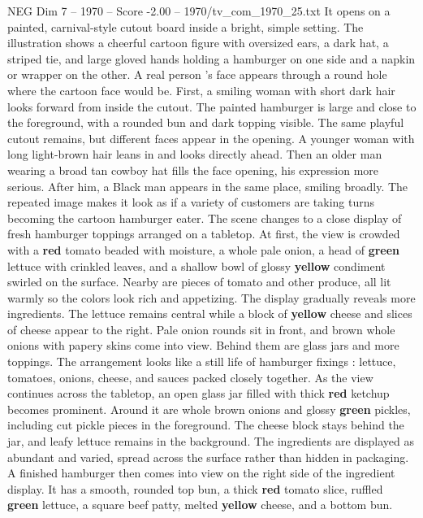 \begin{textsample}{NEG Dim 7 – 1970 – Score -2.00 – 1970/tv\_com\_1970\_25.txt}  \label{ex:f7_neg_069}
It opens on a painted, carnival-style cutout board inside a bright, simple setting.
The illustration shows a cheerful cartoon figure with oversized ears, a dark hat, a striped tie, and large gloved hands holding a hamburger on one side and a napkin or wrapper on the other.
A real person ’s face appears through a round hole where the cartoon face would be.
First, a smiling woman with short dark hair looks forward from inside the cutout.
The painted hamburger is large and close to the foreground, with a rounded bun and dark topping visible.
The same playful cutout remains, but different faces appear in the opening.
A younger woman with long light-brown hair leans in and looks directly ahead.
Then an older man wearing a broad tan cowboy hat fills the face opening, his expression more serious.
After him, a Black man appears in the same place, smiling broadly.
The repeated image makes it look as if a variety of customers are taking turns becoming the cartoon hamburger eater.
The scene changes to a close display of fresh hamburger toppings arranged on a tabletop.
At first, the view is crowded with a \textbf{red} tomato beaded with moisture, a whole pale onion, a head of \textbf{green} lettuce with crinkled leaves, and a shallow bowl of glossy \textbf{yellow} condiment swirled on the surface.
Nearby are pieces of tomato and other produce, all lit warmly so the colors look rich and appetizing.
The display gradually reveals more ingredients.
The lettuce remains central while a block of \textbf{yellow} cheese and slices of cheese appear to the right.
Pale onion rounds sit in front, and brown whole onions with papery skins come into view.
Behind them are glass jars and more toppings.
The arrangement looks like a still life of hamburger fixings : lettuce, tomatoes, onions, cheese, and sauces packed closely together.
As the view continues across the tabletop, an open glass jar filled with thick \textbf{red} ketchup becomes prominent.
Around it are whole brown onions and glossy \textbf{green} pickles, including cut pickle pieces in the foreground.
The cheese block stays behind the jar, and leafy lettuce remains in the background.
The ingredients are displayed as abundant and varied, spread across the surface rather than hidden in packaging.
A finished hamburger then comes into view on the right side of the ingredient display.
It has a smooth, rounded top bun, a thick \textbf{red} tomato slice, ruffled \textbf{green} lettuce, a square beef patty, melted \textbf{yellow} cheese, and a bottom bun.

\end{textsample}
